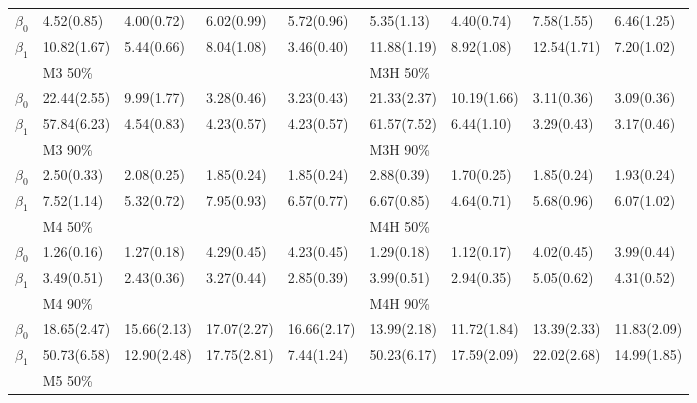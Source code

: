 \documentclass[12pt]{article}
\begin{document}
\begin{center}
\begin{table}[h]
\begin{tabular}[tb]{cllllllll}
      $\beta_0$ & 4.52(0.85)  & 4.00(0.72)  & 6.02(0.99)  & 5.72(0.96)  & 5.35(1.13)  & 4.40(0.74)  & 7.58(1.55)  & 6.46(1.25)  \\
      $\beta_1$ & 10.82(1.67) & 5.44(0.66)  & 8.04(1.08)  & 3.46(0.40)  & 11.88(1.19) & 8.92(1.08)  & 12.54(1.71) & 7.20(1.02)  \\
      \hline
                & M3 50\%     &             &             &             & M3H 50\%    &             &             &             \\
      $\beta_0$ & 22.44(2.55) & 9.99(1.77)  & 3.28(0.46)  & 3.23(0.43)  & 21.33(2.37) & 10.19(1.66) & 3.11(0.36)  & 3.09(0.36)  \\
      $\beta_1$ & 57.84(6.23) & 4.54(0.83)  & 4.23(0.57)  & 4.23(0.57)  & 61.57(7.52) & 6.44(1.10)  & 3.29(0.43)  & 3.17(0.46)  \\
                & M3 90\%     &             &             &             & M3H 90\%    &             &             &             \\
      $\beta_0$ & 2.50(0.33)  & 2.08(0.25)  & 1.85(0.24)  & 1.85(0.24)  & 2.88(0.39)  & 1.70(0.25)  & 1.85(0.24)  & 1.93(0.24)  \\
      $\beta_1$ & 7.52(1.14)  & 5.32(0.72)  & 7.95(0.93)  & 6.57(0.77)  & 6.67(0.85)  & 4.64(0.71)  & 5.68(0.96)  & 6.07(1.02)  \\
      \hline
                & M4 50\%     &             &             &             & M4H 50\%    &             &             &             \\
      $\beta_0$ & 1.26(0.16)  & 1.27(0.18)  & 4.29(0.45)  & 4.23(0.45) 	& 1.29(0.18)  & 1.12(0.17)  & 4.02(0.45)  & 3.99(0.44)  \\
      $\beta_1$ & 3.49(0.51)  & 2.43(0.36)  & 3.27(0.44)  & 2.85(0.39)  & 3.99(0.51)  & 2.94(0.35)  & 5.05(0.62)  & 4.31(0.52)  \\
                & M4 90\%     &             &             &             & M4H 90\%    &             &             &             \\
      $\beta_0$ & 18.65(2.47) & 15.66(2.13) & 17.07(2.27) & 16.66(2.17) & 13.99(2.18) & 11.72(1.84) & 13.39(2.33) & 11.83(2.09) \\
      $\beta_1$ & 50.73(6.58) & 12.90(2.48) & 17.75(2.81) & 7.44(1.24)  & 50.23(6.17) & 17.59(2.09) & 22.02(2.68) & 14.99(1.85) \\
      \hline
                & M5 50\%     &             &             &             &             &             &             &             \\

\end{tabular}
\end{table}
\end{center}
\end{document}
